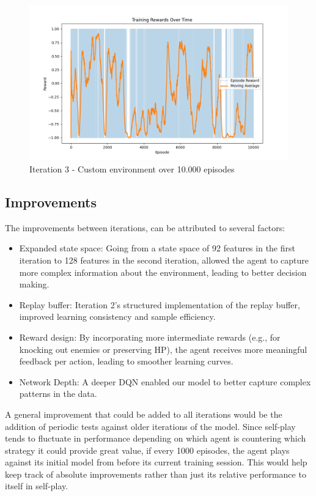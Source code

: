 \begin{figure}[H]
    \centering
    \includegraphics[width=\textwidth]{assets/iteration-3-10k-rewards.png}
    \caption{Iteration 3 - Custom environment over 10.000 episodes}
    \label{fig:iteration-3-graph}
\end{figure}

\subsection{Improvements}
The improvements between iterations, can be attributed to several factors:
\begin{itemize}
    \item Expanded state space: Going from a state space of 92 features in the first iteration
          to 128 features in the second iteration, allowed the agent to capture more complex information
          about the environment, leading to better decision making.
    \item Replay buffer: Iteration 2's structured implementation of the replay buffer, improved
          learning consistency and sample efficiency.
    \item Reward design: By incorporating more intermediate rewards (e.g., for knocking out enemies or preserving HP),
          the agent receives more meaningful feedback per action, leading to smoother learning curves.
    \item Network Depth: A deeper DQN enabled our model to better capture complex patterns in the data.
\end{itemize}

A general improvement that could be added to all iterations would be the addition of periodic tests against older iterations of the model.
Since self-play tends to fluctuate in performance depending on which agent is countering which strategy it could provide great value, if 
every 1000 episodes, the agent plays against its initial model from before its current training session. This would help keep track of 
absolute improvements rather than just its relative performance to itself in self-play.
